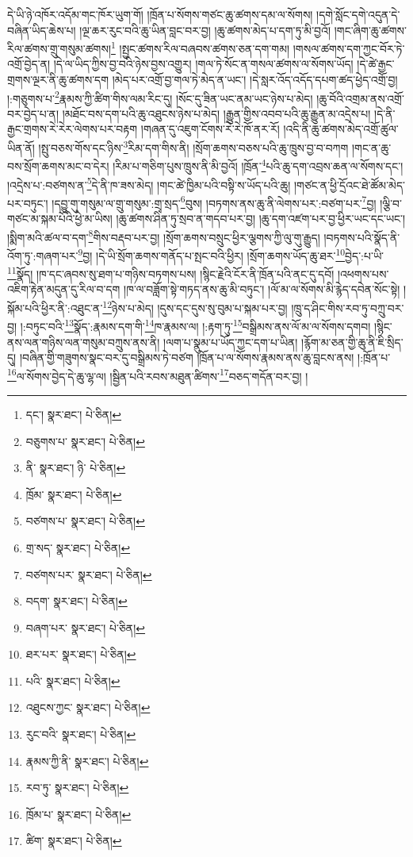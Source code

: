 དེ་ཡི་ཉེ་འཁོར་འདོམ་གང་ཁོར་ཡུག་གོ། །ཁྲོན་པ་སོགས་གཙང་ཆུ་ཚགས་དམ་ལ་སོགས། །དགེ་སློང་དགེ་འདུན་དེ་བཞིན་ཡིད་ཆེས་པ། །ལྔ་ཆར་རུང་བའི་ཆུ་ཡིན་བླང་བར་བྱ། །ཆུ་ཚགས་མེད་པ་དག་ཏུ་མི་བྱའོ། །གང་ཞིག་ཆུ་ཚགས་རིལ་ཚགས་གྲུ་གསུམ་ཚགས།\footnote{དང་།  སྣར་ཐང་།  པེ་ཅིན། } །སྤྱང་ཚགས་རིལ་བཞབས་ཚགས་ཅན་དག་གམ། །གསལ་ཚགས་དག་ཀྱང་བོར་ཏེ་འགྲོ་བྱེད་ན། །དེ་ལ་ཡིད་ཀྱིས་བྱ་བའི་ཉེས་བྱས་འགྱུར། །གལ་ཏེ་སོང་ན་གསལ་ཚགས་ལ་སོགས་ཡོད། །དེ་ཚེ་རྒྱང་གྲགས་ལྔར་ནི་ཆུ་ཚགས་དག །མེད་པར་འགྲོ་བྱ་གལ་ཏེ་མེད་ན་ཡང་། །དེ་སླར་འོད་འདོད་དཔག་ཚད་ཕྱེད་འགྲོ་བྱ། །:གཅུགས་པ་\footnote{བཅུགས་པ་  སྣར་ཐང་།  པེ་ཅིན། }རྣམས་ཀྱི་ཚིག་གིས་ལམ་རིང་དུ། །སོང་དུ་ཟིན་ཡང་ནམ་ཡང་ཉེས་པ་མེད། །ཆུ་བོའི་འགྲམ་ནས་འགྲོ་བར་བྱེད་པ་ན། །མཐོང་བས་དག་པའི་ཆུ་འཐུངས་ཉེས་པ་མེད། །རྒྱུན་གྱིས་འབབ་པའི་ཆུ་རྒྱུན་མ་འདྲེས་པ། །དེ་ནི་རྒྱང་གྲགས་རེ་རེར་ལེགས་པར་བརྟག །གཞན་དུ་འཇུག་ངོགས་རེ་རེ་ཁོ་ནར་རོ། །འདི་ནི་ཆུ་ཚགས་མེད་འགྲོ་ཚུལ་ཡིན་ནོ། །སྤུ་བཅས་གོས་དང་ཉིས་\footnote{ནི་  སྣར་ཐང་། ཉི་  པེ་ཅིན། }རིམ་དག་གིས་ནི། །སྲོག་ཆགས་བཅས་པའི་ཆུ་ཁྲུས་བྱ་བ་བཀག །གང་ན་ཆུ་བས་སྲོག་ཆགས་མང་བ་དེར། །རིམ་པ་གཅིག་པུས་ཁྲུས་ནི་མི་བྱའོ། །ཁྲོན་\footnote{ཁྲོམ་  སྣར་ཐང་།  པེ་ཅིན། }པའི་ཆུ་དག་འབྲས་ཆན་ལ་སོགས་དང་། །འདྲེས་པ་:བཙགས་ན་\footnote{བཙགས་པ་  སྣར་ཐང་།  པེ་ཅིན། }དེ་ནི་ཁ་ཟས་མེད། །གང་ཚེ་ཁྱིམ་པའི་བསྟི་ས་ཡོད་པའི་ཆུ། །གཙང་ན་ཕྱི་དྲོའང་ཐེ་ཚོམ་མེད་པར་བཏུང་། །དབྱུ་གུ་གསུམ་ལ་གྲུ་གསུམ་:གྲྭ་སྲད་\footnote{གྲ་སད་  སྣར་ཐང་།  པེ་ཅིན། }བུས། །བཏགས་ནས་ཆུ་ནི་ལེགས་པར་:བཙག་པར་\footnote{བཙགས་པར་  སྣར་ཐང་།  པེ་ཅིན། }བྱ། །ལྕི་བ་གཙང་མ་སྐམ་པོའི་ཕྱེ་མ་ཡིས། །ཆུ་ཚགས་ཤིན་ཏུ་སྲབ་ན་གདབ་པར་བྱ། །ཆུ་དག་འཛག་པར་བྱ་ཕྱིར་ཡང་དང་ཡང་། །སྨིག་མའི་ཚལ་བ་དག་\footnote{བདག་  སྣར་ཐང་།  པེ་ཅིན། }གིས་བརྡབ་པར་བྱ། །སྲོག་ཆགས་བསྲུང་ཕྱིར་ལྕགས་ཀྱི་ལུ་གུ་རྒྱུད། །བཏགས་པའི་སྣོད་ནི་འོག་ཏུ་:གཞག་པར་\footnote{བཞག་པར་  སྣར་ཐང་།  པེ་ཅིན། }བྱ། །དེ་ཡི་སྲོག་ཆགས་གནོད་པ་སྤང་བའི་ཕྱིར། །སྲོག་ཆགས་ཡོད་ཆུ་ཐར་\footnote{ཐར་པར་  སྣར་ཐང་།  པེ་ཅིན། }བྱེད་:པ་ཡི་\footnote{པའི་  སྣར་ཐང་།  པེ་ཅིན། }སྣོད། །ཁ་དང་ཞབས་སུ་ཐག་པ་གཉིས་བཏགས་པས། །སྙིང་རྗེའི་ངོར་ནི་ཁྲོན་པའི་ནང་དུ་དབོ། །འཕགས་པས་འཇིག་རྟེན་མདུན་དུ་རིལ་བ་དག །ཁ་ལ་བཟློག་སྟེ་གཏད་ནས་ཆུ་མི་བཏུང་། །ལོ་མ་ལ་སོགས་མི་རྙེད་དབེན་སོང་སྟེ། །སྐོམ་པའི་ཕྱིར་ནི་:འཐུང་ན་\footnote{འཐུངས་ཀྱང་  སྣར་ཐང་།  པེ་ཅིན། }ཉེས་པ་མེད། །དུས་དང་དུས་སུ་བུམ་པ་སྐམ་པར་བྱ། །ཁྲུ་ད་ཤིང་གིས་རབ་ཏུ་བཀྲུ་བར་བྱ། །:བཏུང་བའི་\footnote{རུང་བའི་  སྣར་ཐང་།  པེ་ཅིན། }སྣོད་:རྣམས་དག་གི་\footnote{རྣམས་ཀྱི་ནི་  སྣར་ཐང་།  པེ་ཅིན། }ཁ་རྣམས་ལ། །:རྟག་ཏུ་\footnote{རབ་ཏུ་  སྣར་ཐང་།  པེ་ཅིན། }བསྒྲིམས་ནས་ལོ་མ་ལ་སོགས་དགབ། །སྙིང་ནས་ལན་གཉིས་ལན་གསུམ་བཀྲུས་ནས་ནི། །ལག་པ་སྣུམ་པ་ཡོད་ཀྱང་དག་པ་ཡིན། །རྙོག་མ་ཅན་གྱི་ཆུ་ནི་ཇི་སྲིད་དུ། །བཞིན་གྱི་གཟུགས་སྣང་བར་དུ་བསྒྲིམས་ཏེ་བཙག །ཁྲོན་པ་ལ་སོགས་རྣམས་ནས་ཆུ་བླངས་ནས། །:ཁྲོན་པ་\footnote{ཁྲོམ་པ་  སྣར་ཐང་།  པེ་ཅིན། }ལ་སོགས་བྱེད་དེ་ཆུ་ལྷ་ལ། །སྦྱིན་པའི་རབས་མཐུན་ཚིགས་\footnote{ཚིག་  སྣར་ཐང་།  པེ་ཅིན། }བཅད་གདོན་བར་བྱ། །
